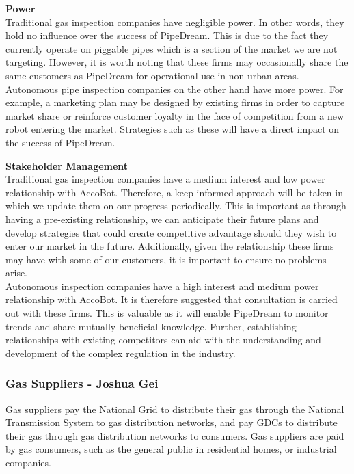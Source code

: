 \documentclass[11pt]{article}		%
\begin{document}
            \textbf{Power}
            \\
            Traditional gas inspection companies have negligible power. In other words, they hold no influence over the success of PipeDream. This is due to the fact they currently operate on piggable pipes which is a section of the market we are not targeting. However, it is worth noting that these firms may occasionally share the same customers as PipeDream for operational use in non-urban areas.
            \\
            \hspace*{3ex}Autonomous pipe inspection companies on the other hand have more power. For example, a marketing plan may be designed by existing firms in order to capture market share or reinforce customer loyalty in the face of competition from a new robot entering the market. Strategies such as these will have a direct impact on the success of PipeDream. 
            
            \textbf{Stakeholder Management}
            \\
            Traditional gas inspection companies have a medium interest and low power relationship with AccoBot. Therefore, a keep informed approach will be taken in which we update them on our progress periodically. This is important as through having a pre-existing relationship, we can anticipate their future plans and develop strategies that could create competitive advantage should they wish to enter our market in the future. Additionally, given the relationship these firms may have with some of our customers, it is important to ensure no problems arise.
            \\
            \hspace*{3ex}Autonomous inspection companies have a high interest and medium power relationship with AccoBot. It is therefore suggested that consultation is carried out with these firms. This is valuable as it will enable PipeDream to monitor trends and share mutually beneficial knowledge.  Further, establishing relationships with existing competitors can aid with the understanding and development of the complex regulation in the industry.

		\subsubsection[Gas Suppliers]{Gas Suppliers - Joshua Gei}
		
		Gas suppliers pay the National Grid to distribute their gas through the National Transmission System to gas distribution networks, and pay GDCs to distribute their gas through gas distribution networks to consumers. Gas suppliers are paid by gas consumers, such as the general public in residential homes, or industrial companies.   
		
\end{document}
